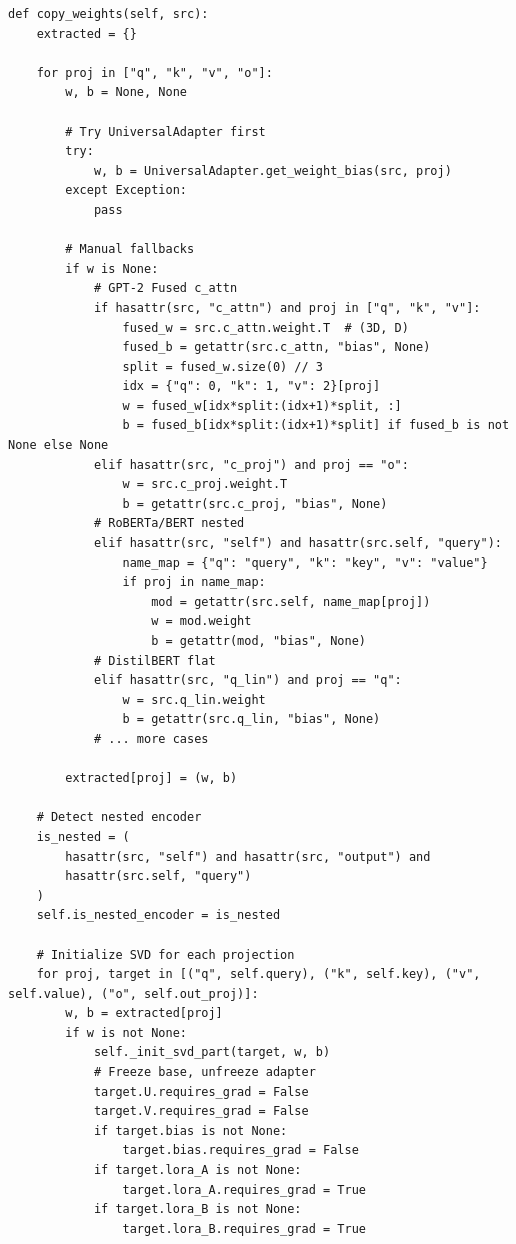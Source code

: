 \begin{lstlisting}
def copy_weights(self, src):
    extracted = {}
    
    for proj in ["q", "k", "v", "o"]:
        w, b = None, None
        
        # Try UniversalAdapter first
        try:
            w, b = UniversalAdapter.get_weight_bias(src, proj)
        except Exception:
            pass
        
        # Manual fallbacks
        if w is None:
            # GPT-2 Fused c_attn
            if hasattr(src, "c_attn") and proj in ["q", "k", "v"]:
                fused_w = src.c_attn.weight.T  # (3D, D)
                fused_b = getattr(src.c_attn, "bias", None)
                split = fused_w.size(0) // 3
                idx = {"q": 0, "k": 1, "v": 2}[proj]
                w = fused_w[idx*split:(idx+1)*split, :]
                b = fused_b[idx*split:(idx+1)*split] if fused_b is not None else None
            elif hasattr(src, "c_proj") and proj == "o":
                w = src.c_proj.weight.T
                b = getattr(src.c_proj, "bias", None)
            # RoBERTa/BERT nested
            elif hasattr(src, "self") and hasattr(src.self, "query"):
                name_map = {"q": "query", "k": "key", "v": "value"}
                if proj in name_map:
                    mod = getattr(src.self, name_map[proj])
                    w = mod.weight
                    b = getattr(mod, "bias", None)
            # DistilBERT flat
            elif hasattr(src, "q_lin") and proj == "q":
                w = src.q_lin.weight
                b = getattr(src.q_lin, "bias", None)
            # ... more cases
        
        extracted[proj] = (w, b)
    
    # Detect nested encoder
    is_nested = (
        hasattr(src, "self") and hasattr(src, "output") and
        hasattr(src.self, "query")
    )
    self.is_nested_encoder = is_nested
    
    # Initialize SVD for each projection
    for proj, target in [("q", self.query), ("k", self.key), ("v", self.value), ("o", self.out_proj)]:
        w, b = extracted[proj]
        if w is not None:
            self._init_svd_part(target, w, b)
            # Freeze base, unfreeze adapter
            target.U.requires_grad = False
            target.V.requires_grad = False
            if target.bias is not None:
                target.bias.requires_grad = False
            if target.lora_A is not None:
                target.lora_A.requires_grad = True
            if target.lora_B is not None:
                target.lora_B.requires_grad = True
\end{lstlisting}


